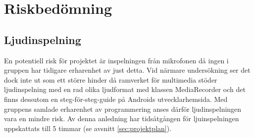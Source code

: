 \section{Riskbedömning}
\subsection{Ljudinspelning}
En potentiell risk för projektet är inspelningen från mikrofonen då ingen i gruppen har tidigare erharenhet av just detta. Vid närmare undersökning ser det dock inte ut som ett större hinder då ramverket för multimedia stöder ljudinspelning med en rad olika ljudformat med klassen MediaRecorder \parencite{sound} och det finns dessutom en steg-för-steg-guide på Androids utvecklarhemsida. Med gruppens samlade erharenhet av programmering anses därför ljudinspelningen vara en mindre risk. Av denna anledning har tidsåtgången för ljuinspelningen uppskattats till 5 timmar (se avsnitt \ref{sec:projektplan}).
